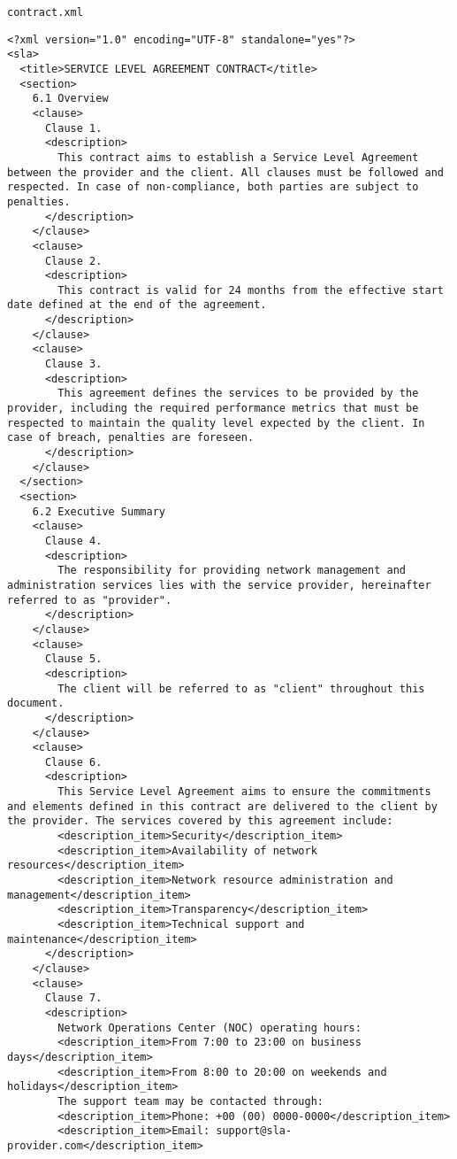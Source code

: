 \texttt{contract.xml}
\begin{lstlisting}
<?xml version="1.0" encoding="UTF-8" standalone="yes"?>
<sla>
  <title>SERVICE LEVEL AGREEMENT CONTRACT</title>
  <section>
    6.1 Overview
    <clause>
      Clause 1.
      <description>
        This contract aims to establish a Service Level Agreement between the provider and the client. All clauses must be followed and respected. In case of non-compliance, both parties are subject to penalties.
      </description>
    </clause>
    <clause>
      Clause 2.
      <description>
        This contract is valid for 24 months from the effective start date defined at the end of the agreement.
      </description>
    </clause>
    <clause>
      Clause 3.
      <description>
        This agreement defines the services to be provided by the provider, including the required performance metrics that must be respected to maintain the quality level expected by the client. In case of breach, penalties are foreseen.
      </description>
    </clause>
  </section>
  <section>
    6.2 Executive Summary
    <clause>
      Clause 4.
      <description>
        The responsibility for providing network management and administration services lies with the service provider, hereinafter referred to as "provider".
      </description>
    </clause>
    <clause>
      Clause 5.
      <description>
        The client will be referred to as "client" throughout this document.
      </description>
    </clause>
    <clause>
      Clause 6.
      <description>
        This Service Level Agreement aims to ensure the commitments and elements defined in this contract are delivered to the client by the provider. The services covered by this agreement include:
        <description_item>Security</description_item>
        <description_item>Availability of network resources</description_item>
        <description_item>Network resource administration and management</description_item>
        <description_item>Transparency</description_item>
        <description_item>Technical support and maintenance</description_item>
      </description>
    </clause>
    <clause>
      Clause 7.
      <description>
        Network Operations Center (NOC) operating hours:
        <description_item>From 7:00 to 23:00 on business days</description_item>
        <description_item>From 8:00 to 20:00 on weekends and holidays</description_item>
        The support team may be contacted through:
        <description_item>Phone: +00 (00) 0000-0000</description_item>
        <description_item>Email: support@sla-provider.com</description_item>

\end{lstlisting}
